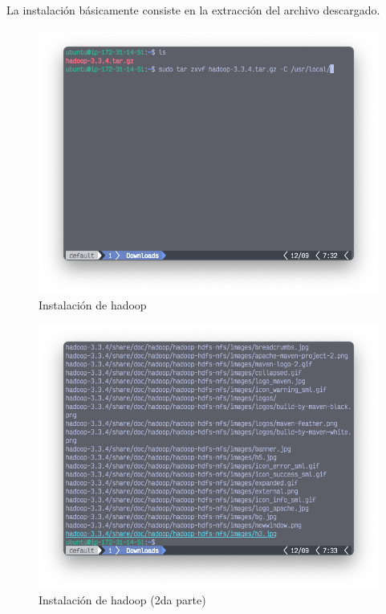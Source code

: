 La instalación básicamente consiste en la extracción del archivo descargado. 
\begin{figure}[h]
	\centering
	\includegraphics[scale=.35] {img/19-tarXVFZ}
	\caption{Instalación de hadoop}
	\label{fig:19}
\end{figure}

\clearpage

\begin{figure}[h]
	\centering
	\includegraphics[scale=.35] {img/20-tarXVFZ-2}
	\caption{Instalación de hadoop (2da parte)}
	\label{fig:20}
\end{figure}

